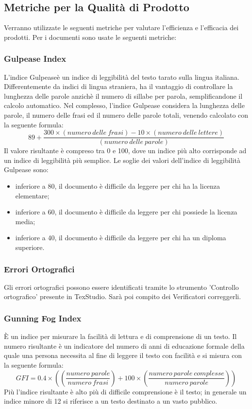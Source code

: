 	\subsection{Metriche per la Qualità di Prodotto}
		Verranno  utilizzate  le  seguenti  metriche  per  valutare  l’efficienza  e  l’efficacia  dei prodotti. \newline Per i documenti sono usate le seguenti metriche:
		\subsubsection{Gulpease Index} L’indice Gulpease\pedice è un indice di leggibilità del testo tarato sulla
		lingua italiana. Differentemente da indici di lingua straniera, ha il vantaggio di controllare
la lunghezza delle parole anzichè il numero di sillabe per parola, semplificandone il calcolo
automatico.
		Nel complesso, l’indice Gulpease considera la lunghezza delle parole, il numero delle frasi
ed il numero delle parole totali, venendo calcolato con la seguente formula:\newline
		\[
		 	89+\frac{300 \times (numero ~delle ~frasi) - 10 \times (numero ~delle ~lettere)}{(numero ~delle ~parole)}
		\]\newline	
		Il valore risultante è compreso tra 0 e 100, dove un indice più alto corrisponde ad un
indice di leggibilità più semplice.
		Le soglie dei valori dell’indice di leggibilità Gulpease sono:
		\begin{itemize}
			\item inferiore a 80, il documento è difficile da leggere per chi ha la licenza elementare;
			\item  inferiore a 60, il documento è difficile da leggere per chi possiede la licenza media;
			\item inferiore a 40, il documento è difficile da leggere per chi ha un diploma superiore.
			\newline
		\end{itemize}
		\subsubsection{Errori Ortografici} Gli errori ortografici possono essere identificati tramite lo strumento 'Controllo
ortografico' presente in TexStudio. Sarà poi compito dei Verificatori correggerli.
\newline
		\subsubsection{Gunning Fog Index} È un indice per misurare la facilità di lettura e di comprensione di un testo. Il numero risultante è un indicatore del numero di anni di educazione formale della quale una persona necessita al fine di leggere il testo con facilità e si misura con la seguente formula:\newline
		\[
		GFI=0.4\times((\frac{numero ~parole}{numero ~frasi})+100\times(\frac{numero ~parole ~complesse}{numero ~parole}))
		\]\newline
		Più l'indice risultante è alto più di difficile comprensione è il testo; in generale un indice minore di 12 si riferisce a un testo destinato a un vasto pubblico.
